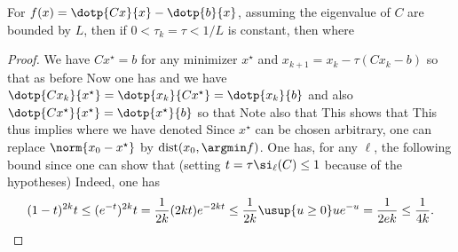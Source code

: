 \begin{prop}\label{prop-graddesc-quad-sublin}
	For $f(x)=\dotp{Cx}{x}-\dotp{b}{x}$, assuming the eigenvalue of $C$ are bounded by $L$, then if $0<\tau_k=\tau < 1/L$ is constant, then
	where 
\end{prop}
\begin{proof}	
	We have $C x^\star=b$ for any minimizer $x^\star$
	and $x_{k+1}=x_k-\tau (C x_k-b)$ so that as before
	Now one has
	and we have $\dotp{Cx_k}{x^\star} = \dotp{x_k}{Cx^\star} = \dotp{x_k}{b}$
	and also $\dotp{Cx^\star}{x^\star} = \dotp{x^\star}{b}$ so that
	Note also that 
	This shows that 
	This thus implies 
	where we have denoted
	Since $x^\star$ can be chosen arbitrary, one can replace $\norm{x_0-x^\star}$ by $\text{\upshape dist}(x_0,\argmin f)$.
	One has, for any $\ell$, the following bound 
	since one can show that (setting $t = \tau \si_\ell(C) \leq 1$ because of the hypotheses)
	Indeed, one has
	\begin{align*}
		(1-t)^{2k} t \leq (e^{-t})^{2k}t
		= \frac{1}{2k} (2kt) e^{-2k t}
		\leq \frac{1}{2k} \usup{u \geq 0} u e^{-u}
		= \frac{1}{2e k} \leq \frac{1}{4k}.
	\end{align*}
\end{proof}	
	



